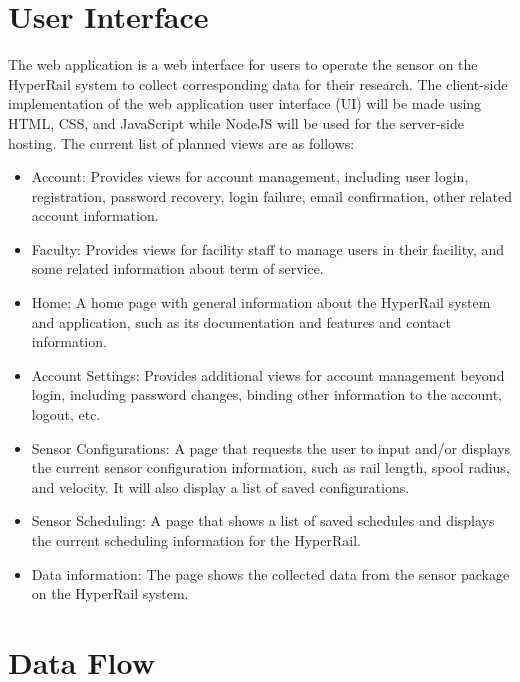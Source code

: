 \documentclass[onecolumn, draftclsnofoot,10pt, compsoc]{IEEEtran}
\begin{document}
\section{User Interface}
The web application is a web interface for users to operate the sensor on the HyperRail system to collect corresponding data for their research. The client-side implementation of the web application user interface (UI) will be made using HTML, CSS, and JavaScript while NodeJS will be used for the server-side hosting. The current list of planned views are as follows:
\begin{itemize}
    \item Account: Provides views for account management, including user login, registration, password recovery, login failure, email confirmation, other related account information. 
    \item Faculty: Provides views for facility staff to manage users in their facility, and some related information about term of service.
    \item Home: A home page with general information about the HyperRail system and application, such as its documentation and features and contact information.
    \item Account Settings: Provides additional views for account management beyond login, including password changes, binding other information to the account, logout, etc.
    \item Sensor Configurations: A page that requests the user to input and/or displays the current sensor configuration information, such as rail length, spool radius, and velocity. It will also display a list of saved configurations.
    \item Sensor Scheduling: A page that shows a list of saved schedules and displays the current scheduling information for the HyperRail.
    \item Data information: The page shows the collected data from the sensor package on the HyperRail system.
\end{itemize}


\section{Data Flow}
\end{document}

